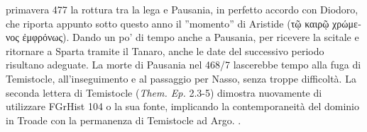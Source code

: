 {primavera 477 la rottura tra la lega e Pausania, in perfetto accordo con Diodoro, che riporta appunto sotto questo anno il ''momento'' di Aristide (\textgreek{τῷ καιρῷ χρώμενος ἐμφρόνως}). Dando un po' di tempo anche a Pausania, per ricevere la scitale e ritornare a Sparta tramite il Tanaro, anche le date del successivo periodo risultano adeguate. La morte di Pausania nel 468/7 lascerebbe tempo alla fuga di Temistocle, all'inseguimento e al passaggio per Nasso, senza troppe difficoltà.
            La seconda lettera di Temistocle (\emph{Them. Ep.}  2.3-5) dimostra nuovamente di utilizzare FGrHist 104 o la sua fonte, implicando la contemporaneità del dominio in Troade con la permanenza di Temistocle ad Argo. \cite[222]{CulassoGastaldi1990}. 
}
